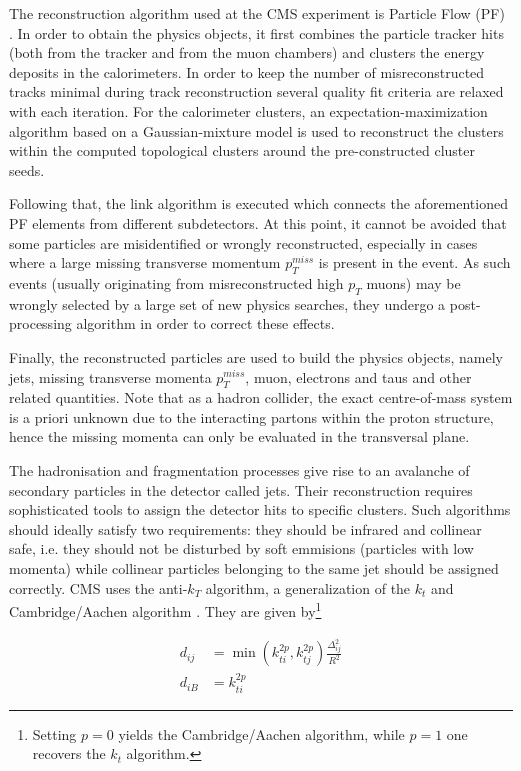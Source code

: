 The reconstruction algorithm used at the CMS experiment is Particle Flow (PF) \cite{Sirunyan_2017}. In order to obtain the physics objects, it first combines the particle tracker hits (both from the tracker and from the muon chambers) and clusters the energy deposits in the calorimeters. In order to keep the number of misreconstructed tracks minimal during track reconstruction several quality fit criteria are relaxed with each iteration. For the calorimeter clusters, an expectation-maximization algorithm based on a Gaussian-mixture model is used to reconstruct the clusters within the computed topological clusters around the pre-constructed cluster seeds.

Following that, the link algorithm is executed which connects the aforementioned PF elements from different subdetectors. At this point, it cannot be avoided that some particles are misidentified or wrongly reconstructed, especially in cases where a large missing transverse momentum $p^{miss}_T$ is present in the event. As such events (usually originating from misreconstructed high $p_T$ muons) may be wrongly selected by a large set of new physics searches, they undergo a post-processing algorithm in order to correct these effects.

Finally, the reconstructed particles are used to build the physics objects, namely jets, missing transverse momenta $p^{miss}_T$, muon, electrons and taus and other related quantities. Note that as a hadron collider, the exact centre-of-mass system is a priori unknown due to the interacting partons within the proton structure, hence the missing momenta can only be evaluated in the transversal plane.


The hadronisation and fragmentation processes give rise to an avalanche of secondary particles in the detector called jets. Their reconstruction requires sophisticated tools to assign the detector hits to specific clusters. Such algorithms should ideally satisfy two requirements: they should be infrared and collinear safe, i.e. they should not be disturbed by soft emmisions (particles with low momenta) while collinear particles belonging to the same jet should be assigned correctly. CMS uses the anti-$k_T$ algorithm, a generalization of the $k_t$ and Cambridge/Aachen algorithm \cite{Cacciari_2008}. They are given by\footnote{Setting $p=0$ yields the Cambridge/Aachen algorithm, while $p=1$ one recovers the $k_t$ algorithm.}

\begin{equation*}
	\begin{aligned}
		d_{ij} &= \min\left(k^{2p}_{ti}, k^{2p}_{tj}\right)\frac{\Delta^2_{ij}}{R^2} \\
		d_{iB} &= k^{2p}_{ti}
	\end{aligned}
\end{equation*}

